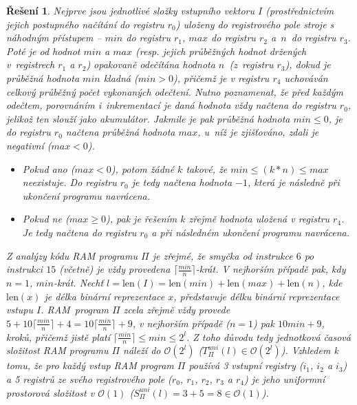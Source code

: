 \documentclass[a4paper]{article}
\let\var\mathit
\let\fnc\mathrm
\newcommand{\bigO}[1]{\mathcal{O}(#1)}
\newcommand{\ceil}[1]{\lceil#1\rceil}
\newcommand{\len}[1]{\fnc{len}(#1)}
\theoremstyle{result}
\newtheorem*{result}{Řešení}
\begin{document}
\begin{enumerate}
\begin{result}
        Nejprve jsou jednotlivé složky vstupního vektoru $I$ (prostřednictvím jejich postupného načítání do registru $r_0$) uloženy do registrového pole stroje s náhodným přístupem -- $\var{min}$ do registru $r_1$, $\var{max}$ do registru $r_2$ a~$n$~do registru $r_3$. Poté je od hodnot $\var{min}$ a $\var{max}$ (resp. jejich průběžných hodnot držených v~registrech $r_1$ a $r_2$) opakovaně odečítána hodnota $n$~(z~registru $r_3$), dokud je průběžná hodnota $\var{min}$ kladná ($\var{min} > 0$), přičemž je v registru $r_4$ uchováván celkový průběžný počet vykonaných odečtení. Nutno poznamenat, že před každým odečtem, porovnáním i~inkrementací je daná hodnota vždy načtena do registru $r_0$, jelikož ten slouží jako akumulátor. Jakmile je pak průběžná hodnota $\var{min} \le 0$, je do registru $r_0$ načtena průběžná hodnota $\var{max}$, u~níž je zjišťováno, zdali je negativní ($\var{max} < 0$).
        \begin{itemize}
            \item Pokud ano ($\var{max} < 0$), potom žádné $k$ takové, že $\var{min} \le (k*n) \le \var{max}$ neexistuje. Do registru $r_0$ je tedy načtena hodnota $-1$, která je následně při ukončení programu navrácena.
            \item Pokud ne ($\var{max} \ge 0$), pak je řešením $k$ zřejmě hodnota uložená v registru $r_4$. Je tedy načtena do registru $r_0$ a při následném ukončení programu navrácena.
        \end{itemize}

        Z analýzy kódu RAM programu $\Pi$ je zřejmé, že smyčka od instrukce $6$ po instrukci $15$ (včetně) je vždy provedena $\ceil{\frac{\var{min}}{n}}$-krát. V nejhorším případě pak, kdy $n = 1$, $\var{min}$-krát. Nechť $l = \len{I} = \len{\var{min}} + \len{\var{max}} + \len{n}$, kde $\len{x}$ je délka binární reprezentace $x$, představuje délku binární reprezentace vstupu $I$. RAM~program $\Pi$ zcela zřejmě vždy provede $5 + 10\ceil{\frac{\var{min}}{n}} + 4 = 10\ceil{\frac{\var{min}}{n}} + 9$, v nejhorším případě ($n = 1$) pak $10\var{min} + 9$, kroků, přičemž jistě platí $\ceil{\frac{\var{min}}{n}} \le \var{min} \le 2^l$. Z toho důvodu tedy jednotková časová složitost RAM programu $\Pi$ náleží do $\bigO{2^l}$ ($T_\Pi^{uni}(l) \in \bigO{2^l}$). Vzhledem k tomu, že pro každý vstup RAM program $\Pi$ používá 3 vstupní registry ($i_1$, $i_2$ a $i_3$) a 5 registrů ze svého registrového pole ($r_0$, $r_1$, $r_2$, $r_3$ a $r_4$) je jeho uniformní prostorová složitost v $\bigO{1}$ ($S_\Pi^{uni}(l) = 3 + 5 = 8 \in \bigO{1}$).


\end{result}
\end{enumerate}
\end{document}
